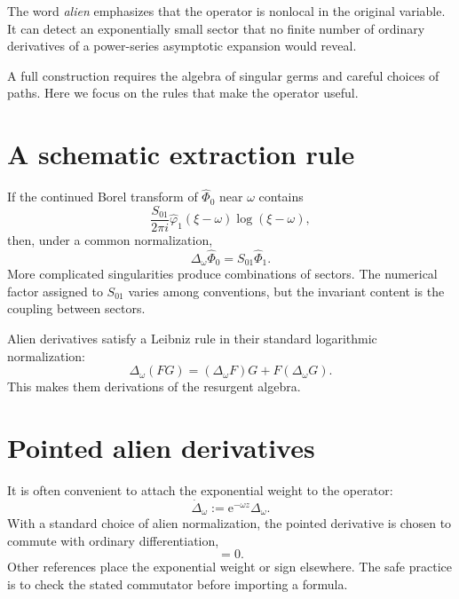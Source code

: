 \documentclass[11pt,oneside]{book}
\theoremstyle{definition}
\theoremstyle{remark}
\newcommand{\e}{\mathrm{e}}
\newcommand{\defeq}{\mathrel{:=}}
\newcommand{\phihat}{\widehat{\Phi}}
\begin{document}
The word \emph{alien} emphasizes that the operator is nonlocal in the original
variable. It can detect an exponentially small sector that no finite number of
ordinary derivatives of a power-series asymptotic expansion would reveal.

A full construction requires the algebra of singular germs and careful choices
of paths. Here we focus on the rules that make the operator useful.

\section{A schematic extraction rule}

If the continued Borel transform of $\phihat_0$ near $\omega$ contains
\[
  \frac{S_{01}}{2\pi i}\widehat\varphi_1(\xi-\omega)
  \log(\xi-\omega),
\]
then, under a common normalization,
\begin{equation}
  \Delta_\omega\phihat_0=S_{01}\phihat_1.
  \label{eq:alien-extracts-sector}
\end{equation}
More complicated singularities produce combinations of sectors. The numerical
factor assigned to $S_{01}$ varies among conventions, but the invariant content
is the coupling between sectors.

Alien derivatives satisfy a Leibniz rule in their standard logarithmic
normalization:
\begin{equation}
  \Delta_\omega(FG)
  =(\Delta_\omega F)G+F(\Delta_\omega G).
  \label{eq:alien-leibniz}
\end{equation}
This makes them derivations of the resurgent algebra.

\section{Pointed alien derivatives}

It is often convenient to attach the exponential weight to the operator:
\begin{equation}
  \dot\Delta_\omega
  \defeq \e^{-\omega z}\Delta_\omega.
  \label{eq:pointed-alien-derivative}
\end{equation}
With a standard choice of alien normalization, the pointed derivative is chosen
to commute with ordinary differentiation,
\begin{equation}
  [\partial_z,\dot\Delta_\omega]=0.
  \label{eq:pointed-commutator}
\end{equation}
Other references place the exponential weight or sign elsewhere. The safe
practice is to check the stated commutator before importing a formula.
\end{document}
